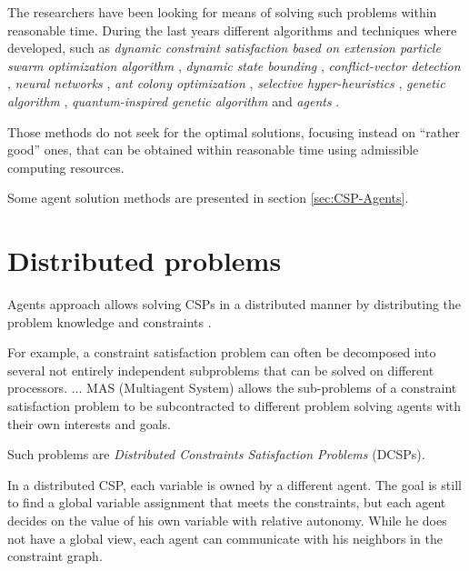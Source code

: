 \documentclass[header]{subfiles}
\begin{document}
\medskip
\noindent
The researchers have been looking for means of solving such problems within
reasonable time. During the last years different algorithms and techniques where
developed, such as
\emph{dynamic constraint satisfaction based on extension particle swarm
      optimization algorithm} \cite{CSPswarm},
\emph{dynamic state bounding} \cite{CSPdynStateBound},
\emph{conflict-vector detection} \cite{CSPtimetable},
\emph{neural networks} \cite{CSPneuro},
\emph{ant colony optimization} \cite{CSPlimmemACO, CSPcunningACO},
\emph{selective hyper-heuristics} \cite{CSPhypHeur},
\emph{genetic algorithm} \cite{UCSP-GA},
\emph{quantum-inspired genetic algorithm} \cite{QuantumGeneticAlgorithm}
and \emph{agents} \cite{CSPagent2013, CSPagent2014, DCSPagent1998}.

\medskip

Those methods do not seek for the optimal solutions, focusing instead on
``rather good'' ones, that can be obtained within reasonable time using admissible
computing resources.

\bigskip

\noindent
Some agent solution methods are presented in section \ref{sec:CSP-Agents}.







\section{Distributed problems}
Agents approach allows solving CSPs in a distributed manner by distributing
the problem knowledge and constraints
\cite{DCSP2013, CSPagent2014, MAS, MAS-Survey, DCSPagent1998}.

\begin{displayquote} %
  For example, a constraint satisfaction problem can often be
  decomposed into several not entirely independent
  subproblems that can be solved on different processors. $\dots$
  MAS (Multiagent System) allows the sub-problems of a constraint satisfaction
  problem to be subcontracted to different problem solving agents with their own
  interests and goals.
\end{displayquote}

\noindent
Such problems are \emph{Distributed Constraints Satisfaction Problems} (DCSPs).
\begin{displayquote} %
  In a distributed CSP, each variable is owned by a different agent. The goal is
  still to find a global variable assignment that meets the constraints, but each agent
  decides on the value of his own variable with relative autonomy. While he does
  not have a global view, each agent can communicate with his neighbors in the
  constraint graph.
\end{displayquote}
\end{document}
